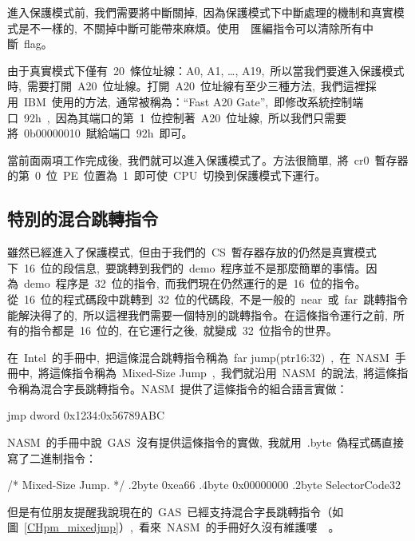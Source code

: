 進入保護模式前,~我們需要將中斷關掉,~因為保護模式下中斷處理的機制和真實模式是不一樣的,~不關掉中斷可能帶來麻煩。使用~~匯編指令可以清除所有中斷~flag。

由于真實模式下僅有~20~條位址線：A0, A1, \ldots, A19,~所以當我們要進入保護模式時,~需要打開~A20~位址線。打開~A20~位址線有至少三種方法,~我們這裡採用~IBM~使用的方法,~通常被稱為：“Fast A20 Gate”,~即修改系統控制端口~92h~,~因為其端口的第~1~位控制著~A20~位址線,~所以我們只需要將~0b00000010~賦給端口~92h~即可。

當前面兩項工作完成後,~我們就可以進入保護模式了。方法很簡單,~將~cr0~暫存器的第~0~位~PE~位置為~1~即可使~CPU~切換到保護模式下運行。

\label{CHpm_enablepm}

\subsection{特別的混合跳轉指令}

雖然已經進入了保護模式,~但由于我們的~CS~暫存器存放的仍然是真實模式下~16~位的段信息,~要跳轉到我們的~demo~程序並不是那麼簡單的事情。因為~demo~程序是~32~位的指令,~而我們現在仍然運行的是~16~位的指令。從~16~位的程式碼段中跳轉到~32~位的代碼段,~不是一般的~near~或~far~跳轉指令能解決得了的,~所以這裡我們需要一個特別的跳轉指令。在這條指令運行之前,~所有的指令都是~16~位的,~在它運行之後,~就變成~32~位指令的世界。

在~Intel~的手冊中,~把這條混合跳轉指令稱為~far jump(ptr16:32)~,~在~NASM~手冊中,~將這條指令稱為~Mixed-Size Jump~,~我們就沿用~NASM~的說法,~將這條指令稱為混合字長跳轉指令。NASM~提供了這條指令的組合語言實做：
\begin{Command}
jmp dword 0x1234:0x56789ABC
\end{Command}
NASM~的手冊中說~GAS~沒有提供這條指令的實做,~我就用~.byte~偽程式碼直接寫了二進制指令：
\begin{Command}
/* Mixed-Size Jump. */
.2byte  0xea66
.4byte  0x00000000
.2byte  SelectorCode32
\end{Command}
但是有位朋友提醒我說現在的~GAS~已經支持混合字長跳轉指令（如圖~\ref{CHpm_mixedjmp}）,~看來~NASM~的手冊好久沒有維護嘍~\smiley~。

\label{CHpm_mixedjmp}

